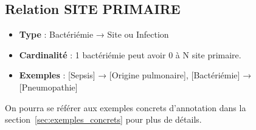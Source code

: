 \subsection{Relation SITE PRIMAIRE}

\begin{itemize}
    \item \textbf{Type} : Bactériémie → Site ou Infection
    \item \textbf{Cardinalité} : 1 bactériémie peut avoir 0 à N site primaire.
    \item \textbf{Exemples} : [Sepsis] → [Origine pulmonaire], [Bactériémie] → [Pneumopathie]
\end{itemize}

On pourra se référer aux exemples concrets d'annotation dans la section~\ref{sec:exemples_concrets} pour plus de détails.